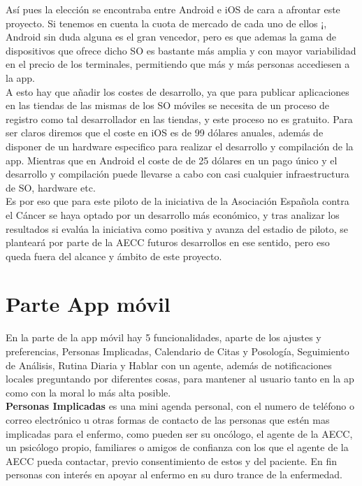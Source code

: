 \documentclass[../pfc.tex]{subfiles}
\begin{document}
	Así pues la elección se encontraba entre Android e iOS de cara a afrontar este proyecto. Si tenemos en cuenta la cuota de mercado de cada uno de ellos ¡, Android sin duda alguna es el gran vencedor, pero es que ademas la gama de dispositivos que ofrece dicho SO es bastante más amplia y con mayor variabilidad en el precio de los terminales, permitiendo que más y más personas accediesen a la app. \\
	
	A esto hay que añadir los costes de desarrollo, ya que para publicar aplicaciones en las tiendas de las mismas de los SO móviles se necesita de un proceso de registro como tal desarrollador en las tiendas, y este proceso no es gratuito. Para ser claros diremos que el coste en iOS es de 99 dólares anuales, además de disponer de un hardware especifico para realizar el desarrollo y compilación de la app. Mientras que en Android el coste de de 25 dólares en un pago único y el desarrollo y compilación puede llevarse a cabo con casi cualquier infraestructura de SO, hardware etc. \\
	
	Es por eso que para este piloto de la iniciativa de la Asociación Española contra el Cáncer se haya optado por un desarrollo más económico, y tras analizar los resultados si evalúa la iniciativa como positiva y avanza del estadio de piloto, se planteará por parte de la AECC futuros desarrollos en ese sentido, pero eso queda fuera del alcance y ámbito de este proyecto. 	\\

	\section{Parte App móvil}
	
	En la parte de la app móvil hay 5 funcionalidades, aparte de los ajustes y preferencias, Personas Implicadas, Calendario de Citas y Posología, Seguimiento de Análisis, Rutina Diaria y Hablar con un agente, además de notificaciones locales preguntando por diferentes cosas, para mantener al usuario tanto en la ap como con la moral lo más alta posible.\\
	
	\textbf{Personas Implicadas} es una mini agenda personal, con el numero de teléfono o correo electrónico u otras formas de contacto de las personas que estén mas implicadas para el enfermo, como pueden ser su oncólogo, el agente de la AECC, un psicólogo propio, familiares o amigos de confianza con los que el agente de la AECC pueda contactar, previo consentimiento de estos y del paciente. En fin personas con interés en apoyar al enfermo en su duro trance de la enfermedad.\\
	
\end{document}
